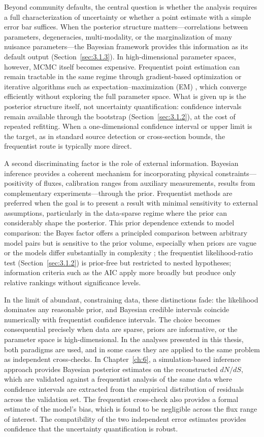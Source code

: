 Beyond community defaults, the central question is whether the analysis requires a full characterization of uncertainty or whether a point estimate with a simple error bar suffices.
When the posterior structure matters---correlations between parameters, degeneracies, multi-modality, or the marginalization of many nuisance parameters---the Bayesian framework provides this information as its default output (Section~\ref{sec:3.1.3}).
In high-dimensional parameter spaces, however, MCMC itself becomes expensive.
Frequentist point estimation can remain tractable in the same regime through gradient-based optimization or iterative algorithms such as expectation--maximization (EM) , which converge efficiently without exploring the full parameter space.
What is given up is the posterior structure itself, not uncertainty quantification: confidence intervals remain available through the bootstrap (Section~\ref{sec:3.1.2}), at the cost of repeated refitting.
When a one-dimensional confidence interval or upper limit is the target, as in standard source detection or cross-section bounds, the frequentist route is typically more direct.

A second discriminating factor is the role of external information.
Bayesian inference provides a coherent mechanism for incorporating physical constraints---positivity of fluxes, calibration ranges from auxiliary measurements, results from complementary experiments---through the prior.
Frequentist methods are preferred when the goal is to present a result with minimal sensitivity to external assumptions, particularly in the data-sparse regime where the prior can considerably shape the posterior.
This prior dependence extends to model comparison: the Bayes factor offers a principled comparison between arbitrary model pairs but is sensitive to the prior volume, especially when priors are vague or the models differ substantially in complexity \cite{Kass:1995}; the frequentist likelihood-ratio test (Section~\ref{sec:3.1.2}) is prior-free but restricted to nested hypotheses; information criteria such as the AIC apply more broadly but produce only relative rankings without significance levels.

In the limit of abundant, constraining data, these distinctions fade: the likelihood dominates any reasonable prior, and Bayesian credible intervals coincide numerically with frequentist confidence intervals.
The choice becomes consequential precisely when data are sparse, priors are informative, or the parameter space is high-dimensional.
In the analyses presented in this thesis, both paradigms are used, and in some cases they are applied to the same problem as independent cross-checks.
In Chapter~\ref{ch:6}, a simulation-based inference approach provides Bayesian posterior estimates on the reconstructed $dN/dS$, which are validated against a frequentist analysis of the same data where confidence intervals are extracted from the empirical distribution of residuals across the validation set.
The frequentist cross-check also provides a formal estimate of the model's bias, which is found to be negligible across the flux range of interest.
The compatibility of the two independent error estimates provides confidence that the uncertainty quantification is robust.
